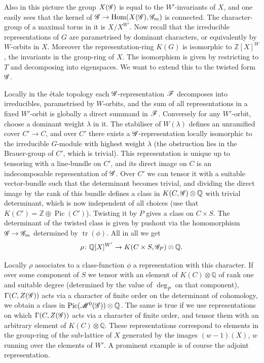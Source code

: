 \documentclass[12pt,english]{smfart}
\DeclareMathOperator{\Hom}{Hom} \DeclareMathOperator{\Ext}{Ext} \DeclareMathOperator{\Der}{Der} \DeclareMathOperator{\rank}{rank} \DeclareMathOperator{\rk}{rk} \DeclareMathOperator{\Spec}{Spec} \DeclareMathOperator{\depth}{depth} \DeclareMathOperator{\genus}{genus} \DeclareMathOperator{\Lie}{Lie} \DeclareMathOperator{\Ad}{Ad} \DeclareMathOperator{\ad}{ad} \DeclareMathOperator{\id}{id} \DeclareMathOperator{\tr}{tr} \DeclareMathOperator{\ch}{ch} \DeclareMathOperator{\Td}{Td} \DeclareMathOperator{\gr}{gr} \DeclareMathOperator{\Pic}{Pic} \DeclareMathOperator{\Aut}{Aut} \DeclareMathOperator{\Out}{Out} \DeclareMathOperator{\Gal}{Gal} \DeclareMathOperator{\PGL}{PGL} \DeclareMathOperator{\GL}{GL} \DeclareMathOperator{\SL}{SL} \DeclareMathOperator{\Ima}{Im} \newcommand{\HDR}{H_{\mathrm{DR}}} \newcommand{\Mpar}{\sM^{0}_{\theta}(\sG)_{\mathrm{par}}}
\theoremstyle{plain} \newtheorem{innerthm}{Theorem} \newtheorem{innerlem}{Lemma} \newtheorem{innerprop}{Proposition} \newtheorem{innercor}{Corollary} \theoremstyle{definition} \newtheorem{innerdefn}{Definition} \newtheorem{innerconstr}{Construction} \theoremstyle{remark} \newtheorem*{remark}{Remark} \newtheorem*{remarks}{Remarks} \newtheorem*{applications}{Applications}
\begin{document}
Also in this picture the group $X(\mathscr{G})$ is equal to the $W'$-invariants of $X$, and one easily sees that the kernel of $\sG\to\Hom(X(\sG),\sG_m)$ is connected. The character-group of a maximal torus in it is $X/X^{W'}$. Now recall that the irreducible representations of $G$ are parametrised by dominant characters, or equivalently by $W$-orbits in $X$. Moreover the representation-ring $K(G)$ is isomorphic to $\mathbb{Z}[X]^W$, the invariants in the group-ring of $X$. The isomorphism is given by restricting to $T$ and decomposing into eigenspaces. We want to extend this to the twisted form $\mathscr{G}$.

Locally in the \'etale topology each $\mathscr{G}$-representation $\mathscr{F}$ decomposes into irreducibles, parametrised by $W$-orbits, and the sum of all representations in a fixed $W'$-orbit is globally a direct summand in $\mathscr{F}$. Conversely for any $W'$-orbit, choose a dominant weight $\lambda$ in it. The stabiliser of $W(\lambda)$ defines an unramified cover $C'\to C$, and over $C'$ there exists a $\mathscr{G}$-representation locally isomorphic to the irreducible $G$-module with highest weight $\lambda$ (the obstruction lies in the Brauer-group of $C'$, which is trivial). This representation is unique up to tensoring with a line-bundle on $C'$, and its direct image on $C$ is an indecomposable representation of $\mathscr{G}$. Over $C'$ we can tensor it with a suitable vector-bundle such that the determinant becomes trivial, and dividing the direct image by the rank of this bundle defines a class in $K(C,\mathscr{G})\otimes\mathbb{Q}$ with trivial determinant, which is now independent of all choices (use that $K(C')=\mathbb{Z}\oplus\Pic(C')$). Twisting it by $P$ gives a class on $C\times S$. The determinant of the twisted class is given by pushout via the homomorphism $\mathscr{G}\to\mathscr{G}_m$ determined by $\tr(\phi)$. All in all we get
\[
\rho\colon \mathbb{Q}[X]^{W'}\to K(C\times S,\mathscr{G}_P)\otimes\mathbb{Q}.
\]

Locally $\rho$ associates to a class-function $\phi$ a representation with this character. If over some component of $S$ we tensor with an element of $K(C)\otimes\mathbb{Q}$ of rank one and suitable degree (determined by the value of $\deg_P$ on that component), $\Gamma(C,Z(\mathscr{G}))$ acts via a character of finite order on the determinant of cohomology, we obtain a class in $\Pic(\sM^0(\sG))\otimes\mathbb{Q}$. The same is true if we use representations on which $\Gamma(C,Z(\mathscr{G}))$ acts via a character of finite order, and tensor them with an arbitrary element of $K(C)\otimes\mathbb{Q}$. These representations correspond to elements in the group-ring of the sub-lattice of $X$ generated by the images $(w-1)(X)$, $w$ running over the elements of $W'$. A prominent example is of course the adjoint representation.
\end{document}
